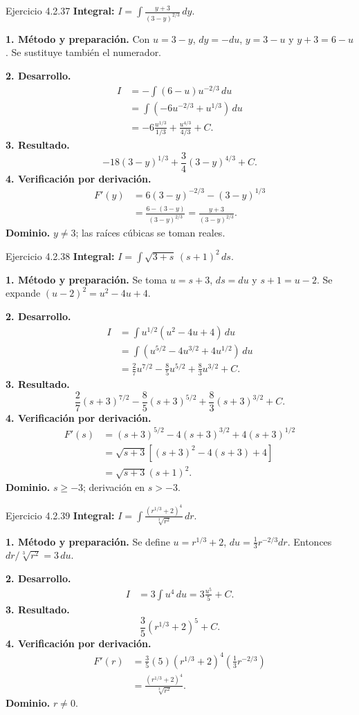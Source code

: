 \begin{examplebox}{Ejercicio 4.2.37}
\textbf{Integral:} $\displaystyle I=\int \frac{y+3}{(3-y)^{2/3}}\,dy$.

\textbf{1. Método y preparación.} Con $u=3-y$, $dy=-du$, $y=3-u$ y $y+3=6-u$. Se sustituye también el numerador.

\textbf{2. Desarrollo.}
\begin{align*}
I&=-\int(6-u)u^{-2/3}\,du\\&=\int(-6u^{-2/3}+u^{1/3})\,du\\&=-6\frac{u^{1/3}}{1/3}+\frac{u^{4/3}}{4/3}+C.
\end{align*}
\textbf{3. Resultado.}
\[
-18(3-y)^{1/3}+\frac34(3-y)^{4/3}+C.
\]
\textbf{4. Verificación por derivación.}
\begin{align*}
F'(y)&=6(3-y)^{-2/3}-(3-y)^{1/3}\\&=\frac{6-(3-y)}{(3-y)^{2/3}}=\frac{y+3}{(3-y)^{2/3}}.
\end{align*}
\textbf{Dominio.} $y\ne3$; las raíces cúbicas se toman reales.
\end{examplebox}

\begin{examplebox}{Ejercicio 4.2.38}
\textbf{Integral:} $\displaystyle I=\int \sqrt{3+s}\,(s+1)^2\,ds$.

\textbf{1. Método y preparación.} Se toma $u=s+3$, $ds=du$ y $s+1=u-2$. Se expande $(u-2)^2=u^2-4u+4$.

\textbf{2. Desarrollo.}
\begin{align*}
I&=\int u^{1/2}(u^2-4u+4)\,du\\&=\int(u^{5/2}-4u^{3/2}+4u^{1/2})\,du\\&=\frac27u^{7/2}-\frac85u^{5/2}+\frac83u^{3/2}+C.
\end{align*}
\textbf{3. Resultado.}
\[
\frac27(s+3)^{7/2}-\frac85(s+3)^{5/2}+\frac83(s+3)^{3/2}+C.
\]
\textbf{4. Verificación por derivación.}
\begin{align*}
F'(s)&=(s+3)^{5/2}-4(s+3)^{3/2}+4(s+3)^{1/2}\\&=\sqrt{s+3}[(s+3)^2-4(s+3)+4]\\&=\sqrt{s+3}(s+1)^2.
\end{align*}
\textbf{Dominio.} $s\ge-3$; derivación en $s>-3$.
\end{examplebox}

\begin{examplebox}{Ejercicio 4.2.39}
\textbf{Integral:} $\displaystyle I=\int \frac{(r^{1/3}+2)^4}{\sqrt[3]{r^2}}\,dr$.

\textbf{1. Método y preparación.} Se define $u=r^{1/3}+2$, $du=\tfrac13r^{-2/3}dr$. Entonces $dr/\sqrt[3]{r^2}=3\,du$.

\textbf{2. Desarrollo.}
\begin{align*}
I&=3\int u^4\,du=3\frac{u^5}{5}+C.
\end{align*}
\textbf{3. Resultado.}
\[
\frac35(r^{1/3}+2)^5+C.
\]
\textbf{4. Verificación por derivación.}
\begin{align*}
F'(r)&=\frac35(5)(r^{1/3}+2)^4\left(\frac13r^{-2/3}\right)\\&=\frac{(r^{1/3}+2)^4}{\sqrt[3]{r^2}}.
\end{align*}
\textbf{Dominio.} $r\ne0$.
\end{examplebox}

